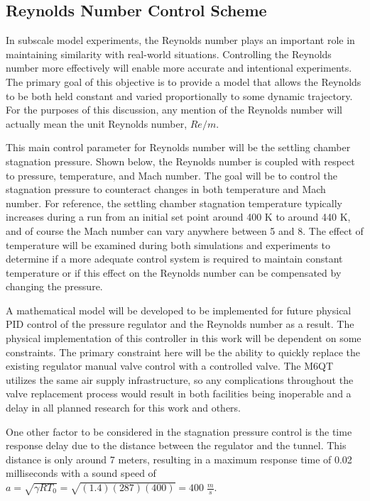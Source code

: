 \subsection{Reynolds Number Control Scheme}

In subscale model experiments, the Reynolds number plays an important role in maintaining similarity with real-world situations. Controlling the Reynolds number more effectively will enable more accurate and intentional experiments. The primary goal of this objective is to provide a model that allows the Reynolds to be both held constant and varied proportionally to some dynamic trajectory. For the purposes of this discussion, any mention of the Reynolds number will actually mean the unit Reynolds number, $Re/m$.

This main control parameter for Reynolds number will be the settling chamber stagnation pressure. Shown below, the Reynolds number is coupled with respect to pressure, temperature, and Mach number. The goal will be to control the stagnation pressure to counteract changes in both temperature and Mach number. For reference, the settling chamber stagnation temperature typically increases during a run from an initial set point around 400 K to around 440 K, and of course the Mach number can vary anywhere between 5 and 8. The effect of temperature will be examined during both simulations and experiments to determine if a more adequate control system is required to maintain constant temperature or if this effect on the Reynolds number can be compensated by changing the pressure.

A mathematical model will be developed to be implemented for future physical PID control of the pressure regulator and the Reynolds number as a result. The physical implementation of this controller in this work will be dependent on some constraints. The primary constraint here will be the ability to quickly replace the existing regulator manual valve control with a controlled valve. The M6QT utilizes the same air supply infrastructure, so any complications throughout the valve replacement process would result in both facilities being inoperable and a delay in all planned research for this work and others.

One other factor to be considered in the stagnation pressure control is the time response delay due to the distance between the regulator and the tunnel. This distance is only around 7 meters, resulting in a maximum response time of 0.02 milliseconds with a sound speed of $a = \sqrt{\gamma R T_0} = \sqrt{(1.4)(287)(400)} = 400 \; \frac{m}{s}$.

